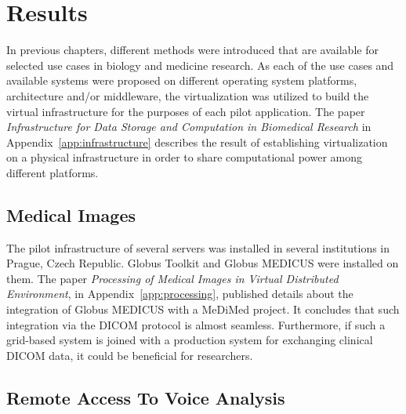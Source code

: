\chapter{Results}
\label{sec:results}
In previous chapters, different methods were introduced that are available for selected use cases in biology and medicine research. 
As each of the use cases and available systems were proposed on different operating system platforms, architecture and/or middleware, the virtualization was utilized to build the virtual infrastructure for the purposes of each pilot application. The paper \cite{kulhanek2010c} \emph{Infrastructure for Data Storage and Computation in Biomedical Research} in Appendix~\ref{app:infrastructure} describes the result of establishing virtualization on a physical infrastructure in order to share computational power among different platforms.

\section{Medical Images}
\label{sec:resultsimages}


The pilot infrastructure of several servers was installed in several institutions in Prague, Czech Republic. Globus Toolkit and Globus MEDICUS were installed on them. The paper \cite{kulhanek2009}  \emph{Processing of Medical Images in Virtual Distributed Environment}, in Appendix~\ref{app:processing}, published details about the integration of Globus MEDICUS with a MeDiMed project. It concludes that such integration via the DICOM protocol is almost seamless. Furthermore, if such a grid-based system is joined with a production system for exchanging clinical DICOM data, it could be beneficial for researchers.

\section{Remote Access To Voice Analysis}
\label{sec:resultsvoice}

